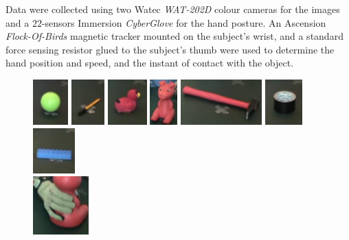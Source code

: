 Data were collected using two Watec \emph{WAT-202D} colour cameras for the images and a $22$-sensors Immersion \emph{CyberGlove} for the hand posture. An Ascension \emph{Flock-Of-Birds} magnetic tracker mounted on the subject's wrist, and a standard force sensing resistor glued to the subject's thumb were used to determine the hand position and speed, and the instant of contact with the object.\\
\begin{figure}[h!]
	\centering
	\includegraphics[height=1.75cm]{images/palla}
	\includegraphics[height=1.75cm]{images/penna}
	\includegraphics[height=1.75cm]{images/papera}
	\includegraphics[height=1.75cm]{images/porcellino}
	\includegraphics[height=1.75cm]{images/martello}
	\includegraphics[height=1.75cm]{images/scotch}
	\includegraphics[height=1.75cm]{images/lego}\\
	\vskip 0.1cm
	\includegraphics[width=0.19\textwidth]{images/cylinder}

\end{figure}
